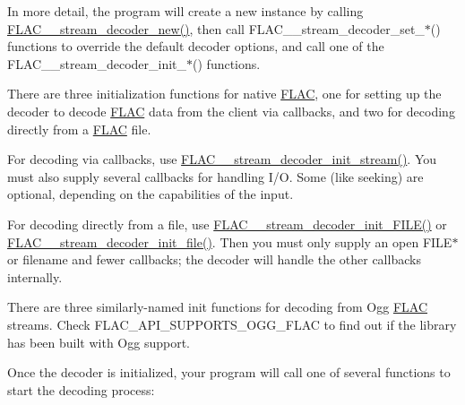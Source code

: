 In more detail, the program will create a new instance by calling \hyperlink{group__flac__stream__decoder_ga7159eefc074dfbab4a37462f69326091}{F\+L\+A\+C\+\_\+\+\_\+stream\+\_\+decoder\+\_\+new()}, then call F\+L\+A\+C\+\_\+\+\_\+stream\+\_\+decoder\+\_\+set\+\_\+$\ast$() functions to override the default decoder options, and call one of the F\+L\+A\+C\+\_\+\+\_\+stream\+\_\+decoder\+\_\+init\+\_\+$\ast$() functions.

There are three initialization functions for native \hyperlink{namespace_f_l_a_c}{F\+L\+AC}, one for setting up the decoder to decode \hyperlink{namespace_f_l_a_c}{F\+L\+AC} data from the client via callbacks, and two for decoding directly from a \hyperlink{namespace_f_l_a_c}{F\+L\+AC} file.

For decoding via callbacks, use \hyperlink{group__flac__stream__decoder_ga32c28a56a2bdfa2333edbd3d991894d7}{F\+L\+A\+C\+\_\+\+\_\+stream\+\_\+decoder\+\_\+init\+\_\+stream()}. You must also supply several callbacks for handling I/O. Some (like seeking) are optional, depending on the capabilities of the input.

For decoding directly from a file, use \hyperlink{group__flac__stream__decoder_ga38f9eb46bf112af205f86b4cbac9980c}{F\+L\+A\+C\+\_\+\+\_\+stream\+\_\+decoder\+\_\+init\+\_\+\+F\+I\+L\+E()} or \hyperlink{group__flac__stream__decoder_ga1692108a97012d1c5f79baf7df012c33}{F\+L\+A\+C\+\_\+\+\_\+stream\+\_\+decoder\+\_\+init\+\_\+file()}. Then you must only supply an open {\ttfamily F\+I\+L\+E$\ast$} or filename and fewer callbacks; the decoder will handle the other callbacks internally.

There are three similarly-\/named init functions for decoding from Ogg \hyperlink{namespace_f_l_a_c}{F\+L\+AC} streams. Check {\ttfamily F\+L\+A\+C\+\_\+\+A\+P\+I\+\_\+\+S\+U\+P\+P\+O\+R\+T\+S\+\_\+\+O\+G\+G\+\_\+\+F\+L\+AC} to find out if the library has been built with Ogg support.

Once the decoder is initialized, your program will call one of several functions to start the decoding process\+:


